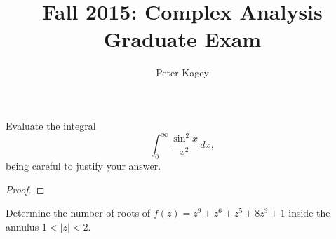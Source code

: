 \documentclass{article}
\newenvironment{problem}[2][Problem]{\begin{trivlist}
\item[\hskip \labelsep {\bfseries #1}\hskip \labelsep {\bfseries #2.}]}{\end{trivlist}}
\begin{document}
\title{Fall 2015: Complex Analysis Graduate Exam}
\author{Peter Kagey}

\maketitle

\begin{problem}{1}
  Evaluate the integral \[
    \int_0^\infty \frac{\sin^2 x}{x^2}\, dx,
  \] being careful to justify your answer.
\end{problem}

\begin{proof}
\end{proof}

\pagebreak

\begin{problem}{2}
  Determine the number of roots of $f(z) = z^9 + z^6 + z^5 + 8z^3 + 1$ inside the annulus $1 < |z| < 2$.
\end{problem}
\end{document}
